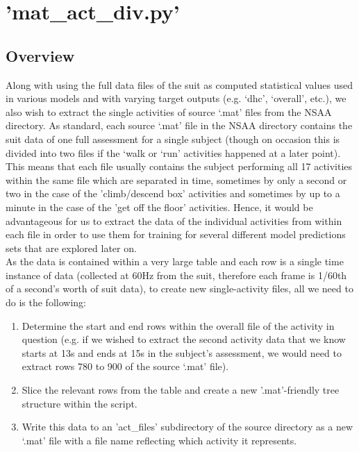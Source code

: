 \documentclass[12pt,twoside]{report}
\begin{document}
\section{'mat\_act\_div.py'}

\subsection{Overview}

\quad Along with using the full data files of the suit as computed statistical values used in various models and with varying target outputs (e.g. ‘dhc’, ‘overall’, etc.), we also wish to extract the single activities of source ‘.mat’ files from the NSAA directory. As standard, each source ‘.mat’ file in the NSAA directory contains the suit data of one full assessment for a single subject (though on occasion this is divided into two files if the ‘walk or ‘run’ activities happened at a later point). This means that each file usually contains the subject performing all 17 activities within the same file which are separated in time, sometimes by only a second or two in the case of the 'climb/descend box' activities and sometimes by up to a minute in the case of the 'get off the floor' activities. Hence, it would be advantageous for us to extract the data of the individual activities from within each file in order to use them for training for several different model predictions sets that are explored later on.\\

\quad As the data is contained within a very large table and each row is a single time instance of data (collected at 60Hz from the suit, therefore each frame is 1/60th of a second's worth of suit data), to create new single-activity files, all we need to do is the following:

\begin{enumerate}
	\item Determine the start and end rows within the overall file of the activity in question (e.g. if we 	wished to extract the second activity data that we know starts at 13s and ends at 15s in the subject's assessment, we would need to extract rows 780 to 900 of the source ‘.mat’ file).
	\item Slice the relevant rows from the table and create a new '.mat'-friendly tree structure within the script.
	\item Write this data to an 'act\_files' subdirectory of the source directory as a new ‘.mat’ file with a file name reflecting which activity it represents.
\end{enumerate}
\end{document}
